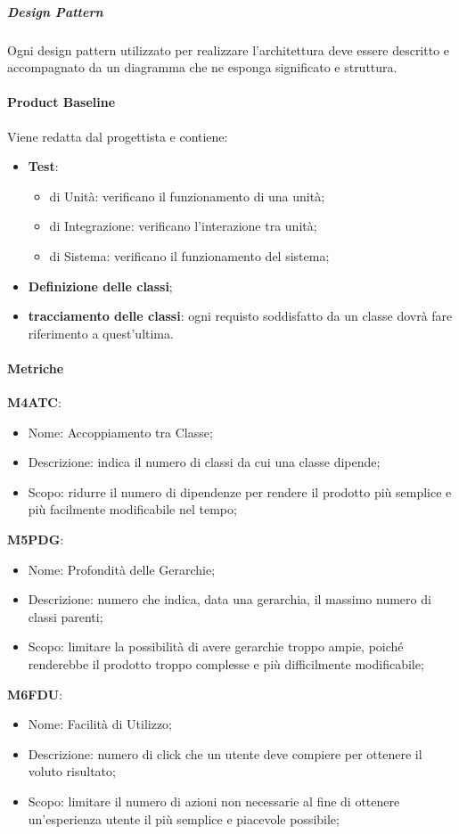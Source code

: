       \subparagraph{Design Pattern} \hfill \break
      Ogni design pattern utilizzato per realizzare l'architettura deve essere descritto e accompagnato da un diagramma che ne esponga significato e struttura.

    \paragraph{Product Baseline} \hfill \break
    Viene redatta dal progettista e contiene:
    \begin{itemize}
      \item \textbf{Test}:
      \begin{itemize}
        \item di Unità: verificano il funzionamento di una unità;
        \item di Integrazione: verificano l'interazione tra unità;
        \item di Sistema: verificano il funzionamento del sistema;
      \end{itemize}
      \item \textbf{Definizione delle classi};
      \item \textbf{tracciamento delle classi}: ogni requisto soddisfatto da un classe dovrà fare riferimento a quest'ultima.
      
    \end{itemize}

    \paragraph{Metriche} \hfill \break
    \textbf{M4ATC}:
    \begin{itemize}
      \item Nome: Accoppiamento tra Classe;
      \item Descrizione: indica il numero di classi da cui una classe dipende;
      \item Scopo: ridurre il numero di dipendenze per rendere il prodotto più semplice e più facilmente modificabile nel tempo;
    \end{itemize}
    \textbf{M5PDG}:
    \begin{itemize}
      \item Nome: Profondità delle Gerarchie;
      \item Descrizione: numero che indica, data una gerarchia, il massimo numero di classi parenti;
      \item Scopo: limitare la possibilità di avere gerarchie troppo ampie, poiché renderebbe il prodotto troppo complesse e più difficilmente modificabile;
    \end{itemize}
    \textbf{M6FDU}:
    \begin{itemize}
      \item Nome: Facilità di Utilizzo;
      \item Descrizione: numero di click che un utente deve compiere per ottenere il voluto risultato;
      \item Scopo: limitare il numero di azioni non necessarie al fine di ottenere un'esperienza utente il più semplice e piacevole possibile;
    \end{itemize}


